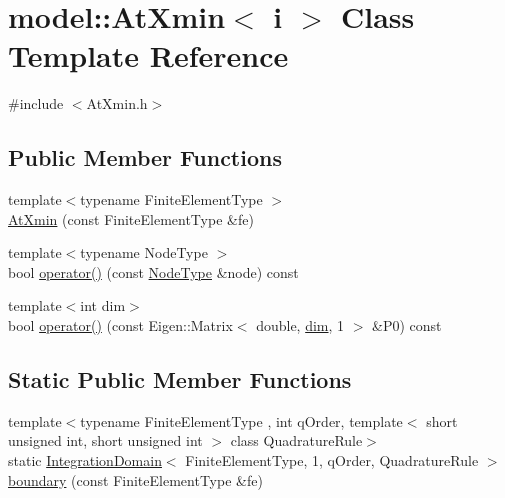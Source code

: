 \hypertarget{classmodel_1_1_at_xmin}{}\section{model\+:\+:At\+Xmin$<$ i $>$ Class Template Reference}
\label{classmodel_1_1_at_xmin}


{\ttfamily \#include $<$At\+Xmin.\+h$>$}

\subsection*{Public Member Functions}
\begin{DoxyCompactItemize}
\item 
{\footnotesize template$<$typename Finite\+Element\+Type $>$ }\\\hyperlink{classmodel_1_1_at_xmin_a927dfe23d7e2701bc03fcfa325e32f40}{At\+Xmin} (const Finite\+Element\+Type \&fe)
\item 
{\footnotesize template$<$typename Node\+Type $>$ }\\bool \hyperlink{classmodel_1_1_at_xmin_a2113f350593bd1fa9a5413c318582f39}{operator()} (const \hyperlink{_network_typedefs_8h_a723f680c66f6a92647827790bcbafce0}{Node\+Type} \&node) const 
\item 
{\footnotesize template$<$int dim$>$ }\\bool \hyperlink{classmodel_1_1_at_xmin_aefbdfb44b3d065290963996d5d45d557}{operator()} (const Eigen\+::\+Matrix$<$ double, \hyperlink{plot_nd_a_8m_a382f3ca768b275b8d563604f7fc7df73}{dim}, 1 $>$ \&P0) const 
\end{DoxyCompactItemize}
\subsection*{Static Public Member Functions}
\begin{DoxyCompactItemize}
\item 
{\footnotesize template$<$typename Finite\+Element\+Type , int q\+Order, template$<$ short unsigned int, short unsigned int $>$ class Quadrature\+Rule$>$ }\\static \hyperlink{structmodel_1_1_integration_domain}{Integration\+Domain}$<$ Finite\+Element\+Type, 1, q\+Order, Quadrature\+Rule $>$ \hyperlink{classmodel_1_1_at_xmin_a5c4e7b2e918b681ae76beca284e943d0}{boundary} (const Finite\+Element\+Type \&fe)
\end{DoxyCompactItemize}


